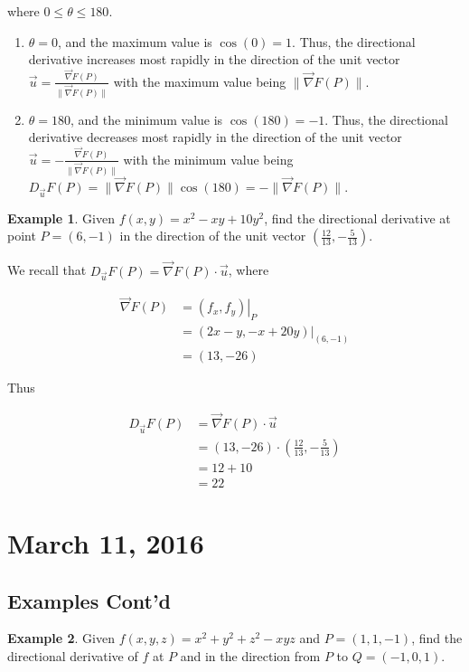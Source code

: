 \documentclass[11pt]{article}
\theoremstyle{plain} %
\theoremstyle{definition}
\theoremstyle{example}
\newtheorem*{example}{Example}
\theoremstyle{remark}
\begin{document}
where $0 \leq \theta \leq 180$. 

\begin{enumerate}
	\item $\theta = 0$, and the maximum value is $\cos(0) = 1$. Thus, the directional derivative increases most rapidly in the direction of the unit vector $\vec{u} = \frac{\vec{\nabla}F(P)}{\|\vec{\nabla}F(P)\|}$ with the maximum value being $\|\vec{\nabla}F(P)\|$.
	\item $\theta = 180$, and the minimum value is $\cos(180) = -1$. Thus, the directional derivative decreases most rapidly in the direction of the unit vector $\vec{u} = -\frac{\vec{\nabla}F(P)}{\|\vec{\nabla}F(P)\|}$ with the minimum value being $	D_{\vec{u}}F(P)= \|\vec{\nabla}F(P)\|\cos(180) = - \|\vec{\nabla}F(P)\|$.
\end{enumerate}

\begin{example}
Given $f(x,y) = x^2-xy+10y^2$, find the directional derivative at point $P=(6,-1)$ in the direction of the unit vector $\left(\frac{12}{13},-\frac{5}{13}\right)$.
\end{example}

We recall that $D_{\vec{u}}F(P) = \vec{\nabla}F(P)\cdot \vec{u}$, where 

\begin{align*}
	\vec{\nabla}F(P) &= \left.(f_x,f_y)\right|_P\\
	&= \left.(2x-y, -x+20y)\right|_{(6,-1)}\\
	&= (13, -26)
\end{align*}

Thus

\begin{align*}
	D_{\vec{u}}F(P) &= \vec{\nabla}F(P)\cdot \vec{u}\\
	&= (13, -26) \cdot \left(\frac{12}{13},-\frac{5}{13}\right)\\
	&= 12 + 10 \\
	&= 22
\end{align*}



\section{March 11, 2016}
\subsection{Examples Cont'd}

\begin{example}
Given $f(x,y,z) = x^2 + y^2 + z^2 -xyz$ and $P=(1,1,-1)$, find the directional derivative of $f$ at $P$ and in the direction from $P$ to $Q=(-1,0,1)$. 
\end{example}
\end{document}
